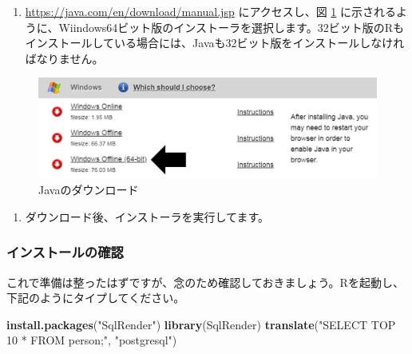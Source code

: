 \documentclass[
  11pt]{book}
\newenvironment{Shaded}{\begin{snugshade}}{\end{snugshade}}
\newcommand{\FunctionTok}[1]{\textcolor[rgb]{0.13,0.29,0.53}{\textbf{#1}}}
\newcommand{\NormalTok}[1]{#1}
\newcommand{\StringTok}[1]{\textcolor[rgb]{0.31,0.60,0.02}{#1}}
\providecommand{\tightlist}{%
  \setlength{\itemsep}{0pt}\setlength{\parskip}{0pt}}
\theoremstyle{definition}
\theoremstyle{definition}
\theoremstyle{definition}
\theoremstyle{definition}
\theoremstyle{remark}
\begin{document}
\begin{enumerate}
\def\labelenumi{\arabic{enumi}.}
\tightlist
\item
  \url{https://java.com/en/download/manual.jsp} にアクセスし、図 \ref{fig:downloadJava} に示されるように、Wiindows64ビット版のインストーラを選択します。32ビット版のRもインストールしている場合には、Javaも32ビット版をインストールしなければなりません。
\end{enumerate}

\begin{figure}

{\centering \includegraphics[width=1\linewidth]{images/OhdsiAnalyticsTools/downloadJava} 

}

\caption{Javaのダウンロード}\label{fig:downloadJava}
\end{figure}

\begin{enumerate}
\def\labelenumi{\arabic{enumi}.}
\setcounter{enumi}{1}
\tightlist
\item
  ダウンロード後、インストーラを実行してます。
\end{enumerate}

\subsubsection*{インストールの確認}\label{ux30a4ux30f3ux30b9ux30c8ux30fcux30ebux306eux78baux8a8d}

これで準備は整ったはずですが、念のため確認しておきましょう。Rを起動し、下記のようにタイプしてください。

\begin{Shaded}
\begin{Highlighting}[]
\FunctionTok{install.packages}\NormalTok{(}\StringTok{"SqlRender"}\NormalTok{)}
\FunctionTok{library}\NormalTok{(SqlRender)}
\FunctionTok{translate}\NormalTok{(}\StringTok{"SELECT TOP 10 * FROM person;"}\NormalTok{, }\StringTok{"postgresql"}\NormalTok{)}
\end{Highlighting}
\end{Shaded}
\end{document}
